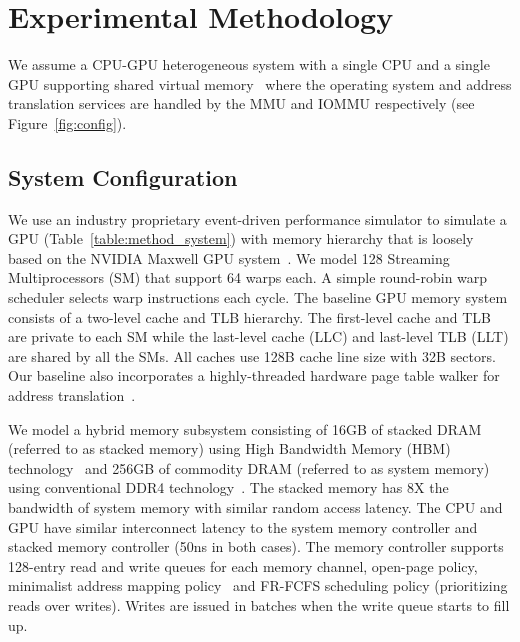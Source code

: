 
\section{Experimental Methodology}
\label{sec:method}

\noindent We assume a CPU-GPU heterogeneous system with a single CPU
and a single GPU supporting shared virtual memory~\cite{intelgen9,
amdzen} where the operating system and address translation services
are handled by the MMU and IOMMU respectively (see
Figure~\ref{fig:config}).



\subsection{System Configuration}

\noindent We use an industry proprietary event-driven performance
simulator to simulate a GPU (Table~\ref{table:method_system}) with
memory hierarchy that is loosely based on the NVIDIA Maxwell GPU
system~\cite{gpu_maxwell}. We model 128 Streaming Multiprocessors (SM)
that support 64 warps each. A simple round-robin warp scheduler
selects warp instructions each cycle. The baseline GPU memory system
consists of a two-level cache and TLB hierarchy. The first-level cache
and TLB are private to each SM while the last-level cache (LLC) and
last-level TLB (LLT) are shared by all the SMs. All caches use 128B
cache line size with 32B sectors. Our baseline also incorporates a
highly-threaded hardware page table walker for address
translation~\cite{power2014supporting, pichaigpu}.


We model a hybrid memory subsystem consisting of 16GB of stacked DRAM
(referred to as stacked memory) using High Bandwidth Memory (HBM)
technology~\cite{hbm-spec} and 256GB of commodity DRAM (referred to as
system memory) using conventional DDR4 technology~\cite{ddr4-spec}.
The stacked memory has 8X the bandwidth of system memory with similar
random access latency. The CPU and GPU have similar interconnect
latency to the system memory controller and stacked memory controller
(50ns in both cases). The memory controller supports 128-entry read
and write queues for each memory channel, open-page policy, minimalist
address mapping policy~\cite{minimalist} and FR-FCFS scheduling policy
(prioritizing reads over writes). Writes are issued in batches when
the write queue starts to fill up. 

